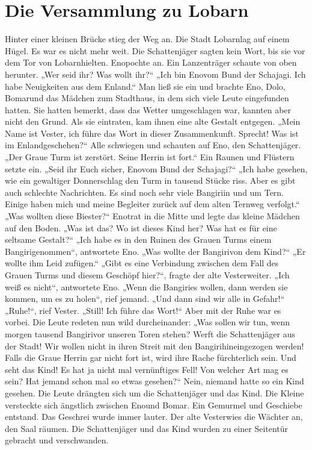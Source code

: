 \documentclass[12pt,a4paper,onecolumn,twoside,ngerman]{book}
\newcommand{\Tern}{Tern}
\newcommand{\Bangiri}{Bangiri}
\newcommand{\Enland}{Enland}
\newcommand{\Eno}{Eno}
\newcommand{\Bomar}{Bomar}
\newcommand{\Do}{Dolo}
\newcommand{\Lobarn}{Lobarn}
\newcommand{\Vester}{Vester}
\begin{document}
\section{Die Versammlung zu \Lobarn}
Hinter einer kleinen Brücke stieg der Weg an. Die Stadt \Lobarn lag auf einem  Hügel. Es war es nicht mehr weit. Die Schattenjäger sagten kein Wort, bis sie vor dem Tor von \Lobarn hielten. \Eno pochte an.
Ein Lanzenträger schaute von oben herunter. 
„Wer seid ihr? Was wollt ihr?“
„Ich bin \Eno vom Bund der Schajagi. Ich habe Neuigkeiten aus dem \Enland.“ 
Man ließ sie ein und brachte \Eno, \Do, \Bomar und das Mädchen zum Stadthaus, in dem sich viele Leute eingefunden hatten. Sie hatten bemerkt, dass das Wetter umgeschlagen war, kannten aber nicht den Grund. Als sie eintraten, kam ihnen eine alte Gestalt entgegen. 
„Mein Name ist \Vester, ich führe das Wort in dieser Zusammenkunft. Sprecht! Was ist im \Enland geschehen?“
Alle schwiegen und schauten auf \Eno, den Schattenjäger.
„Der Graue Turm ist zerstört. Seine Herrin ist fort.“
Ein Raunen und Flüstern setzte ein.
„Seid ihr Euch sicher, \Eno vom Bund der Schajagi?“
„Ich habe gesehen, wie ein gewaltiger Donnerschlag den Turm in tausend Stücke riss. Aber es gibt auch schlechte Nachrichten. Es sind noch sehr viele \Bangiri in und um \Tern. Einige haben mich und meine Begleiter zurück auf dem alten \Tern{weg} verfolgt.“
„Was wollten diese Biester?“
\Eno trat in die Mitte und legte das kleine Mädchen auf den Boden.
„Was ist das? Wo ist dieses Kind her? Was hat es für eine seltsame Gestalt?“
„Ich habe es in den Ruinen des Grauen Turms einem \Bangiri genommen“, antwortete \Eno.
„Was wollte der \Bangiri von dem Kind?“
„Er wollte ihm Leid zufügen.“
„Gibt es eine Verbindung zwischen dem Fall des Grauen Turms und diesem Geschöpf hier?“, fragte der alte \Vester weiter.
„Ich weiß es nicht“, antwortete \Eno.
„Wenn die \Bangiri es wollen, dann werden sie kommen, um es zu holen“, rief jemand. „Und dann sind wir alle in Gefahr!“
„Ruhe!“, rief \Vester. „Still! Ich führe das Wort!“
Aber mit der Ruhe war es vorbei. Die Leute redeten nun wild durcheinander: „Was sollen wir tun, wenn morgen tausend \Bangiri vor unseren Toren stehen? Werft die Schattenjäger aus der Stadt! Wir wollen nicht in ihren Streit mit den \Bangiri hineingezogen werden! Falls die Graue Herrin gar nicht fort ist, wird ihre Rache fürchterlich sein. Und seht das Kind! Es hat ja nicht mal vernünftiges Fell! Von welcher Art mag es sein? Hat jemand schon mal so etwas gesehen?“
Nein, niemand hatte so ein Kind gesehen. Die Leute drängten sich um die Schattenjäger und das Kind. Die Kleine versteckte sich ängstlich zwischen \Eno und \Bomar. Ein Gemurmel und Geschiebe entstand. Das Geschrei wurde immer lauter. Der alte \Vester wies die Wächter an, den Saal räumen. Die Schattenjäger und das Kind wurden zu einer Seitentür gebracht und verschwanden.
\end{document}
